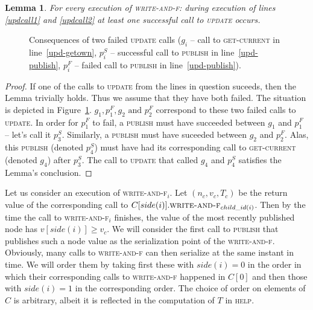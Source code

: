 \documentclass[a4paper,11pt]{article}
\newcommand{\atomic}[4]{\node(lab#1) at (#3,-#4+0.5) {#2};\draw (#3,-#4-0.1) to (lab#1);\node[inner sep=0pt](#1) at (#3,-#4) {};}
\newtheorem{lemma}{Lemma}
\newcommand{\fn}[1]{\textsc{#1}}
\begin{document}
\begin{lemma}
	For every execution of \fn{write-and-f}: during execution of lines \ref{updcall1} and \ref{updcall2} at least one successful call to \fn{update} occurs.
\end{lemma}
\begin{figure}
\caption{Consequences of two failed \fn{update} calls ($g_i$ -- call to \fn{get-current} in line~\ref{upd-getown}, $p^S_{i}$ -- successful call to \fn{publish} in line~\ref{upd-publish}, $p^F_{i}$ -- failed call to \fn{publish} in line~\ref{upd-publish}).}
\label{fig-only-two-pubs}
\end{figure}

\begin{proof}
	If one of the calls to \fn{update} from the lines in question suceeds, then the Lemma trivially holds. Thus we assume that they have both failed. The situation is depicted
	in Figure~\ref{fig-only-two-pubs}. $g_1, p^F_1, g_2 \text{ and } p^F_2$ correspond to these two failed calls to \fn{update}. In order for $p^F_1$ to fail, a \fn{publish} must have
	succeeded between $g_1$ and $p^F_1$ -- let's call it $p^S_3$. Similarly, a \fn{publish} must have suceeded between $g_2$ and $p^F_2$. Alas, this \fn{publish} (denoted $p^S_4$) must have had
	its corresponding call to \fn{get-current} (denoted $g_4$) after $p^S_3$. The call to \fn{update} that called $g_4$ and $p^S_4$ satisfies the Lemma's conclusion.
\end{proof}

Let us consider an execution of \fn{write-and-f$_i$}. Let $(n_c, v_c, T_c)$ be the return value of the corresponding call to $C[side(i)].\fn{write-and-f$_{child\_id(i)}$}$. Then by the time the call to
\fn{write-and-f$_i$} finishes, the value of the most recently published node has $v[side(i)] \geq v_c$. We will consider the first call to \fn{publish} that publishes such a node value as the serialization
point of the \fn{write-and-f}. Obviously, many calls to \fn{write-and-f} can then serialize at the same instant in time. We will order them by taking first these with $side(i) = 0$ in the order in which
their corresponding calls to \fn{write-and-f} happened in $C[0]$ and then those with $side(i) = 1$ in the corresponding order. The choice of order on elements of $C$ is arbitrary, albeit it is reflected
in the computation of $T$ in \fn{help}.
\end{document}

